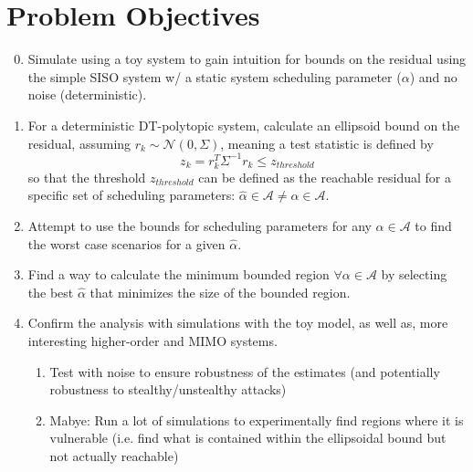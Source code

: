 \documentclass[]{article}
\begin{document}
\section{Problem Objectives}
\begin{enumerate}
	\setcounter{enumi}{-1} %
	\item Simulate using a toy system to gain intuition for bounds on the residual using the simple SISO system w/ a static system scheduling parameter (${\alpha}$) and no noise (deterministic).
	\item For a deterministic DT-polytopic system, calculate an ellipsoid bound on the residual, assuming $r_k \sim \mathcal{N}(0,\Sigma)$, meaning a test statistic is defined by
	$$z_k = r_k^T \Sigma^{-1} r_k \leq z_{threshold}$$
	so that the threshold $z_{threshold}$ can be defined as the reachable residual for a specific set of scheduling parameters: $\hat{\alpha} \in \mathcal{A} \neq {\alpha} \in \mathcal{A}$.
	\item Attempt to use the bounds for scheduling parameters for any ${\alpha}\in \mathcal{A}$ to find the worst case scenarios for a given $\hat{\alpha}$.
	\item Find a way to calculate the minimum bounded region $\forall {\alpha} \in \mathcal{A}$ by selecting the best $\hat{\alpha}$ that minimizes the size of the bounded region.
	\item Confirm the analysis with simulations with the toy model, as well as, more interesting higher-order and MIMO systems.
	\begin{enumerate}
		\item Test with noise to ensure robustness of the estimates (and potentially robustness to stealthy/unstealthy attacks)
		\item Mabye: Run a lot of simulations to experimentally find regions where it is vulnerable (i.e. find what is contained within the ellipsoidal bound but not actually reachable)
	\end{enumerate}
\end{enumerate}
\end{document}
